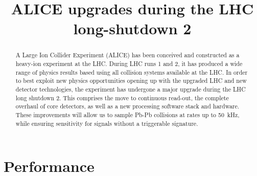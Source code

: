 \documentclass[ALICE,manyauthors]{cernphprep}
\begin{document}
\begin{titlepage}

\title{ALICE upgrades during the LHC long-shutdown 2}


\begin{abstract}
A Large Ion Collider Experiment (ALICE) has been conceived and constructed as a heavy-ion experiment at the LHC. During LHC runs 1 and 2, it has produced a wide range of physics results based using all collision systems available at the LHC.
In order to best exploit new physics opportunities opening up with the upgraded LHC and new detector technologies, the experiment has undergone a major upgrade during the LHC long shutdown 2. This comprises the move to continuous read-out, the complete overhaul of core detectors, as well as a new processing software stack and hardware. 
These improvements will allow us to sample Pb-Pb collisions at rates up to \SI{50}{\kilo\hertz}, while ensuring sensitivity for signals without a triggerable signature.
\end{abstract}
\end{titlepage}

\setcounter{page}{2} %

\tableofcontents
\listoffigures
\listoftables













\section{Performance}


\end{document}
